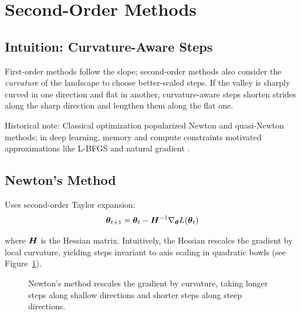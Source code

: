 
\section{Second-Order Methods}
\label{sec:second-order}

\subsection{Intuition: Curvature-Aware Steps}

First-order methods follow the slope; second-order methods also consider the \textit{curvature} of the landscape to choose better-scaled steps. If the valley is sharply curved in one direction and flat in another, curvature-aware steps shorten strides along the sharp direction and lengthen them along the flat one.

Historical note: Classical optimization popularized Newton and quasi-Newton methods; in deep learning, memory and compute constraints motivated approximations like L-BFGS and natural gradient \cite{LiuNocedal1989,Amari1998,GoodfellowEtAl2016,Bishop2006}.

\subsection{Newton's Method}

Uses second-order Taylor expansion:
\begin{equation}
\boldsymbol{\theta}_{t+1} = \boldsymbol{\theta}_t - \boldsymbol{H}^{-1} \nabla_{\boldsymbol{\theta}} L(\boldsymbol{\theta}_t)
\end{equation}

where $\boldsymbol{H}$ is the Hessian matrix. Intuitively, the Hessian rescales the gradient by local curvature, yielding steps invariant to axis scaling in quadratic bowls (see Figure~\ref{fig:newton-bowl}).

\begin{figure}[h]
\centering
{}
\caption{Newton's method rescales the gradient by curvature, taking longer steps along shallow directions and shorter steps along steep directions.}
\label{fig:newton-bowl}
\end{figure}

